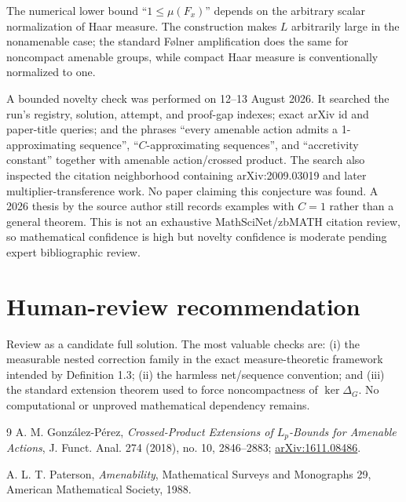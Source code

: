 \documentclass[11pt]{article}
\newcommand{\1}{\mathbf 1}
\begin{document}
The numerical lower bound ``$1\leq\mu(F_x)$'' depends on the arbitrary scalar
normalization of Haar measure.  The construction makes $L$ arbitrarily large
in the nonamenable case; the standard F\o lner amplification does the same for
noncompact amenable groups, while compact Haar measure is conventionally
normalized to one.

A bounded novelty check was performed on 12--13 August 2026.  It searched the
run's registry, solution, attempt, and proof-gap indexes; exact arXiv id and
paper-title queries; and the phrases ``every amenable action admits a
1-approximating sequence'', ``$C$-approximating sequences'', and
``accretivity constant'' together with amenable action/crossed product.  The
search also inspected the citation neighborhood containing arXiv:2009.03019
and later multiplier-transference work.  No paper claiming this conjecture was
found.  A 2026 thesis by the source author still records examples with
$C=1$ rather than a general theorem.  This is not an exhaustive
MathSciNet/zbMATH citation review, so mathematical confidence is high but
novelty confidence is moderate pending expert bibliographic review.

\section{Human-review recommendation}

Review as a candidate full solution.  The most valuable checks are: (i) the
measurable nested correction family in the exact measure-theoretic framework
intended by Definition 1.3; (ii) the harmless net/sequence convention; and
(iii) the standard extension theorem used to force noncompactness of
$\ker\Delta_G$.  No computational or unproved mathematical dependency remains.

\begin{thebibliography}{9}
A. M. Gonz\'alez-P\'erez,
\emph{Crossed-Product Extensions of $L_p$-Bounds for Amenable Actions},
J. Funct. Anal. 274 (2018), no. 10, 2846--2883;
\href{https://arxiv.org/abs/1611.08486}{arXiv:1611.08486}.

A. L. T. Paterson,
\emph{Amenability}, Mathematical Surveys and Monographs 29,
American Mathematical Society, 1988.
\end{thebibliography}
\end{document}
